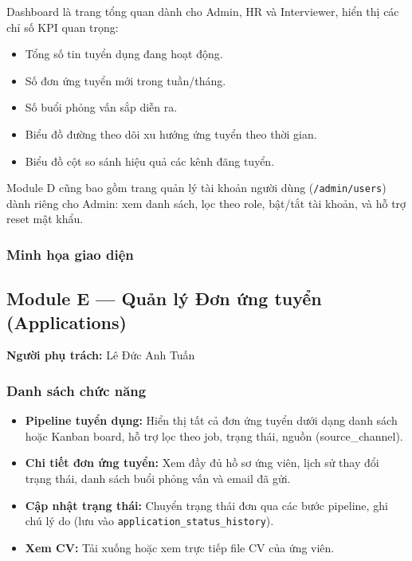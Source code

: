 Dashboard là trang tổng quan dành cho Admin, HR và Interviewer, hiển thị các chỉ số KPI quan trọng:
\begin{itemize}
    \item Tổng số tin tuyển dụng đang hoạt động.
    \item Số đơn ứng tuyển mới trong tuần/tháng.
    \item Số buổi phỏng vấn sắp diễn ra.
    \item Biểu đồ đường theo dõi xu hướng ứng tuyển theo thời gian.
    \item Biểu đồ cột so sánh hiệu quả các kênh đăng tuyển.
\end{itemize}

Module D cũng bao gồm trang quản lý tài khoản người dùng (\texttt{/admin/users}) dành riêng cho Admin: xem danh sách, lọc theo role, bật/tắt tài khoản, và hỗ trợ reset mật khẩu.

\subsubsection*{Minh họa giao diện}

\subsection{Module E --- Quản lý Đơn ứng tuyển (Applications)}
\textbf{Người phụ trách:} Lê Đức Anh Tuấn

\subsubsection*{Danh sách chức năng}
\begin{itemize}
    \item \textbf{Pipeline tuyển dụng:} Hiển thị tất cả đơn ứng tuyển dưới dạng danh sách hoặc Kanban board, hỗ trợ lọc theo job, trạng thái, nguồn (source\_channel).
    \item \textbf{Chi tiết đơn ứng tuyển:} Xem đầy đủ hồ sơ ứng viên, lịch sử thay đổi trạng thái, danh sách buổi phỏng vấn và email đã gửi.
    \item \textbf{Cập nhật trạng thái:} Chuyển trạng thái đơn qua các bước pipeline, ghi chú lý do (lưu vào \texttt{application\_status\_history}).
    \item \textbf{Xem CV:} Tải xuống hoặc xem trực tiếp file CV của ứng viên.
\end{itemize}

